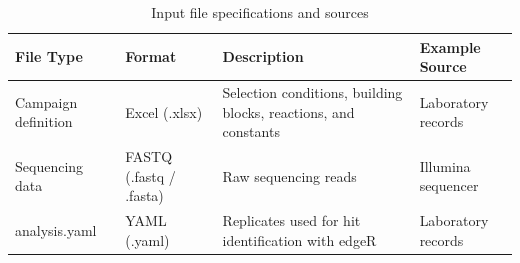 \begin{table}[htbp]
\centering
\caption{Input file specifications and sources}
\label{tab:table1}
\begin{tabular}{p{3.2cm}p{3.0cm}p{5.8cm}p{2.5cm}}
\toprule
File Type & Format & Description & Example Source \\
\midrule
Campaign definition & Excel (.xlsx) & Selection conditions, building blocks, reactions, and constants & Laboratory records \\
Sequencing data & FASTQ (.fastq / .fasta) & Raw sequencing reads & Illumina sequencer \\
analysis.yaml & YAML (.yaml) & Replicates used for hit identification with edgeR & Laboratory records \\
\bottomrule
\end{tabular}
\end{table}
